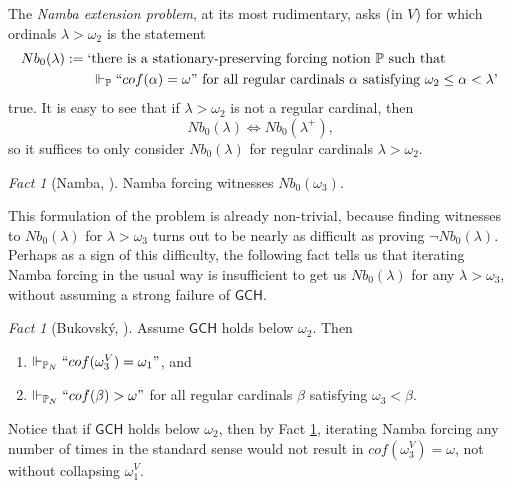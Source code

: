 \documentclass[12pt, twoside]{memoir}
\numberwithin{equation}{section}
\theoremstyle{definition}
\theoremstyle{remark}
\newtheorem{fact}[thm]{Fact}
\theoremstyle{definition}
\theoremstyle{definition}
\theoremstyle{definition}
\theoremstyle{remark}
\begin{document}
The \textit{Namba extension problem}, at its most rudimentary, asks (in $V$) for which ordinals $\lambda > \omega_2$ is the statement
\begin{align*}
    Nb_0(\lambda) := \text{`} & \text{there is a stationary-preserving forcing notion } \mathbb{P} \text{ such that} \\ 
    & \Vdash_{\mathbb{P}} ``cof(\alpha) = \omega" \text{ for all regular cardinals } \alpha \text{ satisfying } \omega_2 \leq \alpha < \lambda \text{'}
\end{align*} 
true. It is easy to see that if $\lambda > \omega_2$ is not a regular cardinal, then 
\begin{equation*}
    Nb_0(\lambda) \iff Nb_0(\lambda^+) \text{,}
\end{equation*}
so it suffices to only consider $Nb_0(\lambda)$ for regular cardinals $\lambda > \omega_2$.

\begin{fact}[Namba, \cite{namba}]
Namba forcing witnesses $Nb_0(\omega_3)$.
\end{fact}

This formulation of the problem is already non-trivial, because finding witnesses to $Nb_0(\lambda)$ for $\lambda > \omega_3$ turns out to be nearly as difficult as proving $\neg Nb_0(\lambda)$. Perhaps as a sign of this difficulty, the following fact tells us that iterating Namba forcing in the usual way is insufficient to get us $Nb_0(\lambda)$ for any $\lambda > \omega_3$, without assuming a strong failure of $\mathsf{GCH}$. 

\begin{fact}[Bukovsk\'{y}, \cite{bukovsky}]\label{fact26}
Assume $\mathsf{GCH}$ holds below $\omega_2$. Then 
\begin{enumerate}[label=(\arabic*)]
    \item\label{fact261} $\Vdash_{\mathbb{P}_{N}} ``cof(\omega_3^V) = \omega_1"$, and
    \item $\Vdash_{\mathbb{P}_{N}} ``cof(\beta) > \omega"$ for all regular cardinals $\beta$ satisfying $\omega_3 < \beta$.
\end{enumerate}
\end{fact}

Notice that if $\mathsf{GCH}$ holds below $\omega_2$, then by Fact \ref{fact26}, iterating Namba forcing any number of times in the standard sense would not result in $cof(\omega_3^V) = \omega$, not without collapsing $\omega_1^V$.
\end{document}
